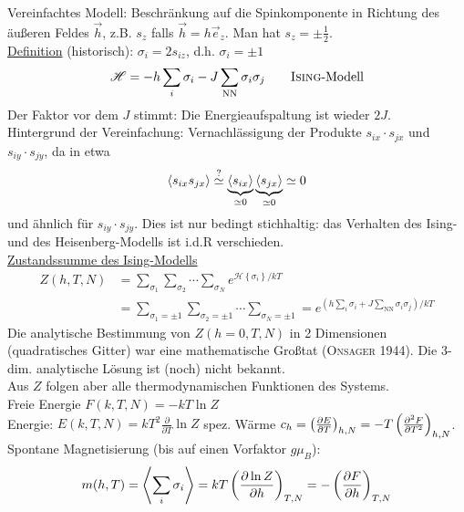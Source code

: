 Vereinfachtes Modell: Beschränkung auf die Spinkomponente in Richtung des äußeren Feldes $\vec{h}$, z.B. $s_z$ falls $\vec{h} = h \vec{e}_z$.
Man hat $s_z = \pm \frac{1}{2}$. \\
\underline{Definition} (historisch): $\sigma_i = 2 s_{iz}$, d.h. $\sigma_i = \pm 1$
\begin{equation}
    \mathscr{H} = - h \sum_i \sigma_i - J \sum_\text{NN} \sigma_i \sigma_j \qquad \text{\textsc{Ising}-Modell}
\end{equation}
Der Faktor vor dem $J$ stimmt: Die Energieaufspaltung ist wieder $2J$. \\
Hintergrund der Vereinfachung: Vernachlässigung der Produkte $s_{ix} \cdot s_{jx}$ und $s_{iy} \cdot s_{jy}$, da in etwa
\begin{equation}
    \left\langle s_{ix} s_{jx}\right\rangle \overset{?}{\simeq} \underbrace{\left\langle s_{ix}\right\rangle}_{\simeq 0} \underbrace{\left\langle s_{jx}\right\rangle}_{\simeq 0} \simeq 0
\end{equation}
und ähnlich für $s_{iy} \cdot s_{jy}$. Dies ist nur bedingt stichhaltig: das Verhalten des Ising- und des Heisenberg-Modells ist i.d.R verschieden.\\
\underline{Zustandssumme des Ising-Modells}
\begin{equation}
    \begin{split}
        Z(h, T, N) &= \sum_{\sigma_1} \sum_{\sigma_2} \cdots \sum_{\sigma_N} e^{\mathscr{H} \left\{ \sigma_i \right\} / k T} \\
        &= \sum_{\sigma_1 = \pm 1} \sum_{\sigma_2 = \pm 1} \cdots \sum_{\sigma_N = \pm 1} = e^{ \left( h \sum_i \sigma_i + J \sum_\text{NN} \sigma_i \sigma_j \right)/kT }
    \end{split}
\end{equation}
Die analytische Bestimmung von $Z(h=0, T, N)$ in 2 Dimensionen (quadratisches Gitter) war eine mathematische Großtat (\textsc{Onsager} 1944).
Die 3-dim. analytische Lösung ist (noch) nicht bekannt.\\
Aus $Z$ folgen aber alle thermodynamischen Funktionen des Systems. \\
Freie Energie $F(k, T, N) = - k T \ln Z$ \\
Energie: $E(k, T, N) = k T^2 \frac{\partial}{\partial T} \ln Z$
spez. Wärme $c_h = \left( \frac{\partial E}{\partial T} \right)_{h, N} = - T \left( \frac{\partial^2 F}{\partial T^2} \right)_{h, N}$. \\
Spontane Magnetisierung (bis auf einen Vorfaktor $g \mu_B$):
\begin{equation}
    m(h, T) = \left\langle\sum_i \sigma_i\right\rangle = k T \left( \frac{\partial \ln Z}{\partial h} \right)_{T, N} = - \left( \frac{\partial F}{\partial h} \right)_{T, N}
\end{equation}
